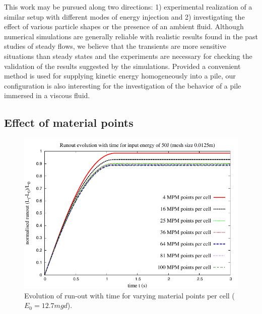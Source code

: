 This work may be pursued along two directions: 1) experimental 
realization of a similar setup with different modes of energy injection and 
2) investigating the effect of various particle shapes or the presence of an 
ambient fluid. Although numerical simulations are generally reliable 
with realistic results found in the past studies of steady flows, we believe 
that the transients are more sensitive situations than steady states and the  
experiments are necessary for checking the validation of the results suggested 
by the simulations. Provided a convenient method is used for supplying kinetic 
energy homogeneously into a pile, our configuration is also interesting for 
the investigation of the behavior of a pile immersed in a viscous 
fluid.

\subsection{Effect of material points}

\begin{figure}[tbhp]
\centering
\includegraphics[width=\textwidth]{Runout_50}
\caption{Evolution of run-out with time for varying material points per cell ($E_0=12.7mgd$).}
\label{fig:Runout_50}
\end{figure}

